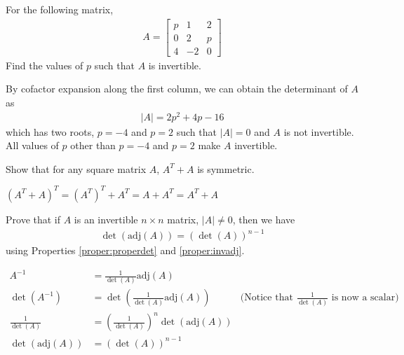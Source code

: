 \begin{Exercise}
For the following matrix,
\begin{align*}
A = 
\begin{bmatrix}
p & 1 & 2\\
0 & 2 & p\\
4 & -2 & 0
\end{bmatrix} 
\end{align*}
Find the values of $p$ such that $A$ is invertible.
\end{Exercise}
\begin{Answer}
By cofactor expansion along the first column, we can obtain the determinant of $A$ as
\begin{align*}
|A| = 2p^2 + 4p - 16
\end{align*}
which has two roots, $p = -4$ and $p = 2$ such that $|A| = 0$ and $A$ is not invertible. All values of $p$ other than $p = -4$ and $p = 2$ make $A$ invertible.
\end{Answer}

\begin{Exercise}
Show that for any square matrix $A$, $A^T + A$ is symmetric.
\end{Exercise}
\begin{Answer}
$(A^T+A)^T = (A^T)^T + A^T = A+A^T = A^T+A $
\end{Answer}

\begin{Exercise}
Prove that if $A$ is an invertible $n \times n$ matrix, $|A| \neq 0$, then we have
\begin{align*}
\det(\text{adj}(A))=(\det(A))^{n-1}    
\end{align*}
using Properties \ref{proper:properdet} and \ref{proper:invadj}.
\end{Exercise}
\begin{Answer}
\begin{align*}
A^{-1} &= \frac{1}{\det(A)}\text{adj}(A) \\
\det(A^{-1}) &= \det(\frac{1}{\det(A)}\text{adj}(A)) & \text{(Notice that $\frac{1}{\det(A)}$ is now a scalar)}\\
\frac{1}{\det(A)} &= (\frac{1}{\det(A)})^n\det(\text{adj}(A)) \\
\det(\text{adj}(A)) &= (\det(A))^{n-1}  
\end{align*}
\end{Answer}